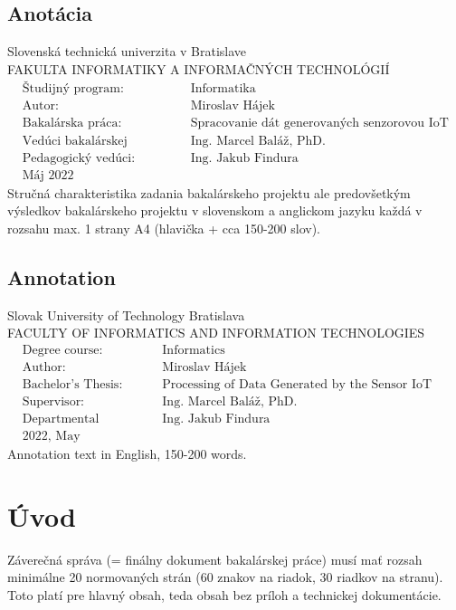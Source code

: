 \documentclass[12pt, a4paper, twoside, openright, slovak]{book}
\newcommand{\emptypage}{\newpage\thispagestyle{empty}\mbox{}\newpage}
\newcommand{\University}[0] {Slovenská technická univerzita v Bratislave}
\newcommand{\UniversityEN}[0] {Slovak University of Technology Bratislava}
\newcommand{\Faculty}[0] {Fakulta informatiky a informačných technológií}
\newcommand{\FacultyEN}[0] {Faculty of Informatics and Information Technologies}
\newcommand{\Thesis}[0] {Bakalárska práca}
\newcommand{\ThesisEN}[0] {Bachelor's Thesis}
\newcommand{\Title}[0] {Spracovanie dát generovaných senzorovou IoT sieťou}
\newcommand{\TitleEN}[0] {Processing of Data Generated by the Sensor IoT Network}
\newcommand{\Author}[0] {Miroslav Hájek}
\newcommand{\Supervisor}[0] {Ing. Marcel Baláž, PhD.}
\newcommand{\PedagogicalSupervisor}[0] {Ing. Jakub Findura}
\newcommand{\Date}[0] {Máj 2022}
\newcommand{\DateEN}[0] {2022, May}
\newcommand{\StudyProgramme}[0] {Informatika}
\newcommand{\StudyProgrammeEN}[0] {Informatics}
\begin{document}
\section*{Anotácia}
\University \\
\uppercase{\Faculty}
\vspace{-8pt}
\begin{align*}
& \text{Študijný program:} && \text{\StudyProgramme} \\
& \text{Autor:} && \text{\Author} \\
& \text{\Thesis:} && \text{\Title} \\
& \text{Vedúci bakalárskej projektu:} && \text{\Supervisor} \\
& \text{Pedagogický vedúci:} && \text{\PedagogicalSupervisor} \\
& \text{\Date}
\end{align*}
Stručná charakteristika zadania bakalárskeho projektu ale predovšetkým výsledkov bakalárskeho projektu v slovenskom a anglickom jazyku každá v rozsahu max. 1 strany A4 (hlavička + cca 150-200 slov).
\emptypage

\thispagestyle{empty}
\section*{Annotation}
\UniversityEN \\
\uppercase{\FacultyEN}
\vspace{-8pt}
\begin{align*}
& \text{Degree course:} && \text{\StudyProgrammeEN} \\
& \text{Author:} && \text{\Author} \\
& \text{\ThesisEN:} && \text{\TitleEN} \\
& \text{Supervisor:} && \text{\Supervisor} \\
& \text{Departmental advisor:} && \text{\PedagogicalSupervisor} \\
& \text{\DateEN}
\end{align*}
Annotation text in English, 150-200 words.
\emptypage

\renewcommand{\contentsname}{Obsah}
\thispagestyle{empty}
\tableofcontents{}
\emptypage


\chapter{Úvod}
Záverečná správa (= finálny dokument bakalárskej práce) musí mať rozsah minimálne 20 normovaných strán (60 znakov na riadok, 30 riadkov na stranu). Toto platí pre hlavný obsah, teda obsah bez príloh a technickej dokumentácie.
\end{document}
